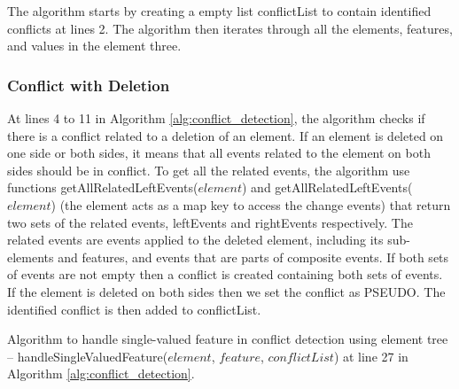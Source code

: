 The algorithm starts by creating a empty list \textsf{conflictList} to contain identified conflicts at lines 2. The algorithm then iterates through all the elements, features, and values in the element three. 

\subsubsection{Conflict with Deletion} 
\label{sec:delete_conflict} 
At lines 4 to 11 in Algorithm \ref{alg:conflict_detection}, the algorithm checks if there is a conflict related to a deletion of an element.
If an element is deleted on one side or both sides, it means that all events related to the element on both sides should be in conflict. 
To get all the related events, the algorithm use functions \textsf{getAllRelatedLeftEvents($element$)} 
and \textsf{getAllRelatedLeftEvents($element$)} (the element acts as a map key to access the change events) that return two sets of the related events, 
\textsf{leftEvents} and \textsf{rightEvents} respectively. The related events are events applied to the deleted element, including its sub-elements and features, 
and events that are parts of composite events. If both sets of events are not empty then a conflict is created containing both sets of events. 
If the element is deleted on both sides then we set the conflict as \textsf{PSEUDO}. The identified conflict is then added to \textsf{conflictList}.

\IncMargin{1.5em}
\begin{algorithm}[]
  \begin{scriptsize}
  \end{scriptsize}
  \caption{Algorithm to handle single-valued feature in conflict detection using element tree -- handleSingleValuedFeature($element$, $feature$, $conflictList$) at line 27 in Algorithm \ref{alg:conflict_detection}.}
  \label{alg:conflict_single_valued_feature}
\end{algorithm}
\DecMargin{1.5em}

